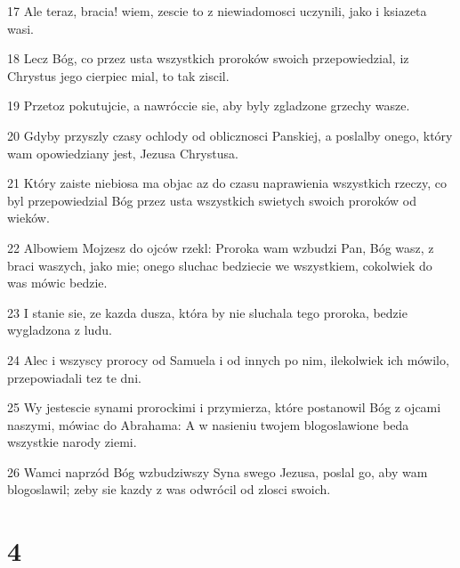 \par 17 Ale teraz, bracia! wiem, zescie to z niewiadomosci uczynili, jako i ksiazeta wasi.
\par 18 Lecz Bóg, co przez usta wszystkich proroków swoich przepowiedzial, iz Chrystus jego cierpiec mial, to tak ziscil.
\par 19 Przetoz pokutujcie, a nawróccie sie, aby byly zgladzone grzechy wasze.
\par 20 Gdyby przyszly czasy ochlody od oblicznosci Panskiej, a poslalby onego, który wam opowiedziany jest, Jezusa Chrystusa.
\par 21 Który zaiste niebiosa ma objac az do czasu naprawienia wszystkich rzeczy, co byl przepowiedzial Bóg przez usta wszystkich swietych swoich proroków od wieków.
\par 22 Albowiem Mojzesz do ojców rzekl: Proroka wam wzbudzi Pan, Bóg wasz, z braci waszych, jako mie; onego sluchac bedziecie we wszystkiem, cokolwiek do was mówic bedzie.
\par 23 I stanie sie, ze kazda dusza, która by nie sluchala tego proroka, bedzie wygladzona z ludu.
\par 24 Alec i wszyscy prorocy od Samuela i od innych po nim, ilekolwiek ich mówilo, przepowiadali tez te dni.
\par 25 Wy jestescie synami prorockimi i przymierza, które postanowil Bóg z ojcami naszymi, mówiac do Abrahama: A w nasieniu twojem blogoslawione beda wszystkie narody ziemi.
\par 26 Wamci naprzód Bóg wzbudziwszy Syna swego Jezusa, poslal go, aby wam blogoslawil; zeby sie kazdy z was odwrócil od zlosci swoich.

\chapter{4}

